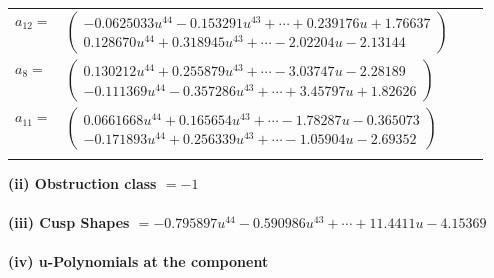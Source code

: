 \documentclass[1p]{elsarticle_modified}
\theoremstyle{definition}
\begin{document}
\begin{tabular}{m{7pt} m{180pt} m{7pt} m{180pt} }
\flushright $a_{12}=$&$\begin{pmatrix}-0.0625033 u^{44}-0.153291 u^{43}+\cdots+0.239176 u+1.76637\\0.128670 u^{44}+0.318945 u^{43}+\cdots-2.02204 u-2.13144\end{pmatrix}$ \\
\flushright $a_{8}=$&$\begin{pmatrix}0.130212 u^{44}+0.255879 u^{43}+\cdots-3.03747 u-2.28189\\-0.111369 u^{44}-0.357286 u^{43}+\cdots+3.45797 u+1.82626\end{pmatrix}$ \\
\flushright $a_{11}=$&$\begin{pmatrix}0.0661668 u^{44}+0.165654 u^{43}+\cdots-1.78287 u-0.365073\\-0.171893 u^{44}+0.256339 u^{43}+\cdots-1.05904 u-2.69352\end{pmatrix}$\\&\end{tabular}
\flushleft \textbf{(ii) Obstruction class $= -1$}\\~\\
\flushleft \textbf{(iii) Cusp Shapes $= -0.795897 u^{44}-0.590986 u^{43}+\cdots+11.4411 u-4.15369$}\\~\\
\newpage\renewcommand{\arraystretch}{1}
\flushleft \textbf{(iv) u-Polynomials at the component}\newline \\
\end{document}

